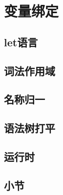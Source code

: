 \chapter{变量绑定}

\section{let语言}

\section{词法作用域}

\section{名称归一}

\section{语法树打平}

\section{运行时}

\section{小节}